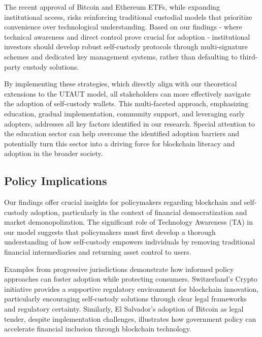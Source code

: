 \documentclass[twocolumn]{article}
\begin{document}
The recent approval of Bitcoin and Ethereum ETFs, while expanding institutional access, risks reinforcing traditional custodial models that prioritize convenience over technological understanding. Based on our findings - where technical awareness and direct control prove crucial for adoption - institutional investors should develop robust self-custody protocols through multi-signature schemes and dedicated key management systems, rather than defaulting to third-party custody solutions.

By implementing these strategies, which directly align with our theoretical extensions to the UTAUT model, all stakeholders can more effectively navigate the adoption of self-custody wallets. This multi-faceted approach, emphasizing education, gradual implementation, community support, and leveraging early adopters, addresses all key factors identified in our research. Special attention to the education sector can help overcome the identified adoption barriers and potentially turn this sector into a driving force for blockchain literacy and adoption in the broader society.

\subsection{Policy Implications}

Our findings offer crucial insights for policymakers regarding blockchain and self-custody adoption, particularly in the context of financial democratization and market demonopolization. The significant role of Technology Awareness (TA) in our model suggests that policymakers must first develop a thorough understanding of how self-custody empowers individuals by removing traditional financial intermediaries and returning asset control to users.

Examples from progressive jurisdictions demonstrate how informed policy approaches can foster adoption while protecting consumers. Switzerland's Crypto initiative provides a supportive regulatory environment for blockchain innovation, particularly encouraging self-custody solutions through clear legal frameworks and regulatory certainty. Similarly, El Salvador's adoption of Bitcoin as legal tender, despite implementation challenges, illustrates how government policy can accelerate financial inclusion through blockchain technology.
\end{document}
